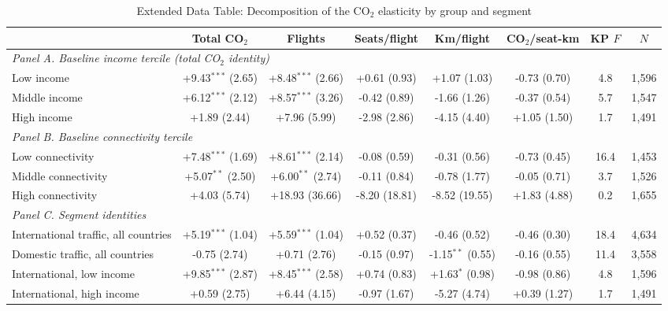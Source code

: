 \begin{table}[htbp]
\centering
\begin{threeparttable}
\caption{Extended Data Table: Decomposition of the CO$_2$ elasticity by group and segment}
\label{tab:decomp_hetero}
\scriptsize
\begin{tabular}{lccccccc}
\toprule
 & Total CO$_2$ & Flights & Seats/flight & Km/flight & CO$_2$/seat-km & KP $F$ & $N$ \\
\midrule
\multicolumn{8}{l}{\textit{Panel A. Baseline income tercile (total CO$_2$ identity)}} \\
  Low income & +9.43$^{***}$ (2.65) & +8.48$^{***}$ (2.66) & +0.61 (0.93) & +1.07 (1.03) & -0.73 (0.70) & 4.8 & 1,596 \\
  Middle income & +6.12$^{***}$ (2.12) & +8.57$^{***}$ (3.26) & -0.42 (0.89) & -1.66 (1.26) & -0.37 (0.54) & 5.7 & 1,547 \\
  High income & +1.89 (2.44) & +7.96 (5.99) & -2.98 (2.86) & -4.15 (4.40) & +1.05 (1.50) & 1.7 & 1,491 \\
\multicolumn{8}{l}{\textit{Panel B. Baseline connectivity tercile}} \\
  Low connectivity & +7.48$^{***}$ (1.69) & +8.61$^{***}$ (2.14) & -0.08 (0.59) & -0.31 (0.56) & -0.73 (0.45) & 16.4 & 1,453 \\
  Middle connectivity & +5.07$^{**}$ (2.50) & +6.00$^{**}$ (2.74) & -0.11 (0.84) & -0.78 (1.77) & -0.05 (0.71) & 3.7 & 1,526 \\
  High connectivity & +4.03 (5.74) & +18.93 (36.66) & -8.20 (18.81) & -8.52 (19.55) & +1.83 (4.88) & 0.2 & 1,655 \\
\multicolumn{8}{l}{\textit{Panel C. Segment identities}} \\
  International traffic, all countries & +5.19$^{***}$ (1.04) & +5.59$^{***}$ (1.04) & +0.52 (0.37) & -0.46 (0.52) & -0.46 (0.30) & 18.4 & 4,634 \\
  Domestic traffic, all countries & -0.75 (2.74) & +0.71 (2.76) & -0.15 (0.97) & -1.15$^{**}$ (0.55) & -0.16 (0.55) & 11.4 & 3,558 \\
  International, low income & +9.85$^{***}$ (2.87) & +8.45$^{***}$ (2.58) & +0.74 (0.83) & +1.63$^{*}$ (0.98) & -0.98 (0.86) & 4.8 & 1,596 \\
  International, high income & +0.59 (2.75) & +6.44 (4.15) & -0.97 (1.67) & -5.27 (4.74) & +0.39 (1.27) & 1.7 & 1,491 \\
\bottomrule
\end{tabular}
\begin{tablenotes}\scriptsize

\end{tablenotes}
\end{threeparttable}
\end{table}
